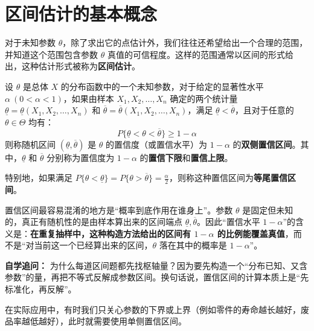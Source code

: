 ﻿\documentclass[lang=cn,11pt]{elegantbook}
\begin{document}
\section{区间估计的基本概念}

对于未知参数 $\theta$，除了求出它的点估计外，我们往往还希望给出一个合理的范围，并知道这个范围包含参数 $\theta$ 真值的可信程度。这样的范围通常以区间的形式给出，这种估计形式被称为\textbf{区间估计}。

\begin{definition}[置信区间与置信水平] \label{def:confidence_interval}
设 $\theta$ 是总体 $X$ 的分布函数中的一个未知参数，对于给定的显著性水平 $\alpha\ (0<\alpha<1)$，如果由样本 $X_1,X_2,\dots,X_n$ 确定的两个统计量 $\underline{\theta}=\underline{\theta}(X_1,X_2,\dots,X_n)$ 和 $\overline{\theta}=\overline{\theta}(X_1,X_2,\dots,X_n)$，满足 $\underline{\theta} < \overline{\theta}$，且对于任意的 $\theta \in \Theta$ 均有：
\begin{equation}
P\{\underline{\theta}<\theta<\overline{\theta}\} \ge 1-\alpha
\end{equation}
则称随机区间 $(\underline{\theta},\overline{\theta})$ 是 $\theta$ 的置信度（或置信水平）为 $1-\alpha$ 的\textbf{双侧置信区间}。其中，$\underline{\theta}$ 和 $\overline{\theta}$ 分别称为置信度为 $1-\alpha$ 的\textbf{置信下限}和\textbf{置信上限}。

特别地，如果满足 $P\{\theta < \underline{\theta}\} = P\{\theta > \overline{\theta}\} = \frac{\alpha}{2}$，则称这种置信区间为\textbf{等尾置信区间}。
\end{definition}

\begin{note}
置信区间最容易混淆的地方是“概率到底作用在谁身上”。参数 \(\theta\) 是固定但未知的，真正有随机性的是由样本算出来的区间端点 \(\underline{\theta},\overline{\theta}\)。因此“置信水平 \(1-\alpha\)”的含义是：\textbf{在重复抽样中，这种构造方法给出的区间有 \(1-\alpha\) 的比例能覆盖真值}，而不是“对当前这一个已经算出来的区间，\(\theta\) 落在其中的概率是 \(1-\alpha\)”。
\end{note}

\begin{note}
\textbf{自学追问：} 为什么每道区间题都先找枢轴量？因为要先构造一个“分布已知、又含参数”的量，再把不等式反解成参数区间。换句话说，置信区间的计算本质上是“先标准化，再反解”。
\end{note}

在实际应用中，有时我们只关心参数的下界或上界（例如零件的寿命越长越好，废品率越低越好），此时就需要使用单侧置信区间。
\end{document}
